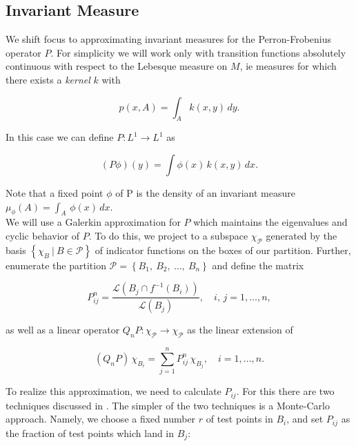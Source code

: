 
\subsection{Invariant Measure}

We shift focus to approximating invariant measures for the Perron-Frobenius operator $P$.
For simplicity we will work only with transition functions absolutely continuous with 
respect to the Lebesque measure on $M$, ie measures for which there exists a 
\emph{kernel} $k$ with 

\begin{equation}
    \label{eq:kernel}
    p(x, A) = \int_A k(x, y)\, dy.
\end{equation}

In this case we can define $P: L^1 \to L^1$ as 

\begin{equation}
    (P \phi)(y) = \int \phi (x)\, k(x, y)\, dx.
\end{equation}

Note that a fixed point $\phi$ of P is the density of an invariant measure 
$\mu_\phi (A) = \int_A\, \phi(x)\, dx$. \\

We will use a Galerkin approximation for $P$ which maintains the eigenvalues and cyclic 
behavior of $P$. To do this, we project to a subspace 
$\chi_{\mathcal{P}}$ generated by the basis $\left\{ \chi_B\ \vert\ B \in \mathcal{P} \right\}$ 
of indicator functions on the boxes of our partition. Further, enumerate the partition 
$\mathcal{P} = \left\{ B_1,\ B_2,\ \ldots,\ B_n \right\}$ and define the matrix 

\begin{equation}
    \label{eq:pij}
    P_{ij}^n = \frac{\mathcal{L}\left(B_j \cap f^{-1}(B_i)\right)}{\mathcal{L}(B_j)}, 
    \quad i,\, j = 1, \ldots, n,
\end{equation}

as well as a linear operator $Q_n P : \chi_{\mathcal{P}} \to \chi_{\mathcal{P}}$ as 
the linear extension of 

\begin{equation}
    \label{eq:qnp}
    (Q_n P)\, \chi_{B_i} = \sum_{j = 1}^n P_{ij}^n\, \chi_{B_j}, \quad i = 1, \ldots, n.
\end{equation}

To realize this approximation, we need to calculate $P_{ij}$. For this there are two 
techniques discussed in \cite*{algGAIO}. The simpler of the two techniques is a 
Monte-Carlo approach. Namely, we choose a fixed number $r$ of test points in 
$B_i$, and set $P_{ij}$ as the fraction of test points which land in $B_j$:

